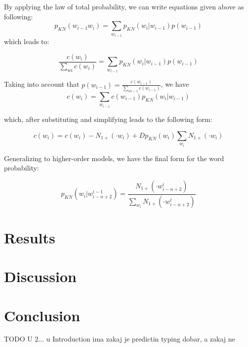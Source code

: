 \documentclass[twoside]{article}
\begin{document}
\begin{multicols}{2}
By applying the law of total probability, we can write equations given above as following:
\begin{equation}
p_{KN}(w_{i-1}w_{i} ) = \sum_{w_{i-1}} p_{KN}(w_{i} | w_{i-1} )p(w_{i-1})
\end{equation}
which leads to:

\begin{equation}
\frac{c(w_{i})}{\sum_{w{i}} c(w_{i})} = \sum_{w_{i-1}} p_{KN}(w_{i} | w_{i-1} )p(w_{i-1})
\end{equation}

Taking into account that $p(w_{i-1}) =\frac{c(w_{i-1})}{\sum_{w{i-1}} c(w_{i-1})} $, we have
\begin{equation}
c(w_{i}) = \sum_{w_{i-1}} c(w_{i-1}) p_{KN}(w_{i} | w_{i-1})
\end{equation}

which, after substituting and simplifying leads to the following form:

\begin{equation}
c(w_{i}) = c(w_{i}) - N_{1+}(\cdot w_{i}) + D p_{KN}(w_{i}) \sum_{w_{i}} N_{1+}(\cdot w_{i})
\end{equation}

Generalizing to higher-order models, we have the final form for the word probability:

\begin{equation}
p_{KN}(w_{i} | w_{i-n+2}^{i-1}) = \frac{N_{1+}(\cdot w_{i-n+2}^{i})}{\sum_{w_{i}}N_{1+}(\cdot w_{i-n+2}^{i})} 
\end{equation}

\section{Results}

\section{Discussion}

\section{Conclusion}
TODO U 2... u Introduction ima zakaj je predictin typing dobar, a zakaj ne


{}
\nocite{*}



\end{multicols}
\end{document}
